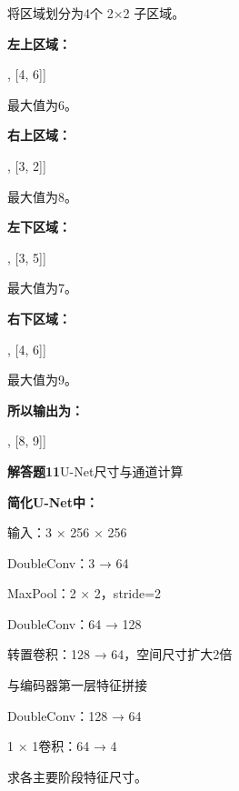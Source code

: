 \documentclass[UTF8,openany,oneside,zihao=-4,fontset=windows]{ctexbook}
\newif\ifshowsolutions
\newcommand{\Question}[2]{%
  \par\Needspace{4\baselineskip}\medskip
  \noindent\textbf{\color{MVBlue}#1}\quad #2\par
}
\newenvironment{AnswerBox}{\begin{tcolorbox}[breakable,colback=MVLight,colframe=MVBlue!45,title={参考答案},fonttitle=\bfseries,boxrule=0.55pt,arc=1.5mm,left=2mm,right=2mm,top=1.5mm,bottom=1.5mm]}{\end{tcolorbox}}
\newcommand{\PracticeSpace}[1]{\ifshowsolutions\else\par\vspace{#1}\par\fi}
\begin{document}
\begin{AnswerBox}
\par 将区域划分为4个 2×2 子区域。
\par\noindent\textbf{左上区域：}
\begin{center}\small\ttfamily [[1, 5], [4, 6]]\end{center}
\par 最大值为6。
\par\noindent\textbf{右上区域：}
\begin{center}\small\ttfamily [[2, 8], [3, 2]]\end{center}
\par 最大值为8。
\par\noindent\textbf{左下区域：}
\begin{center}\small\ttfamily [[7, 2], [3, 5]]\end{center}
\par 最大值为7。
\par\noindent\textbf{右下区域：}
\begin{center}\small\ttfamily [[9, 1], [4, 6]]\end{center}
\par 最大值为9。
\par\noindent\textbf{所以输出为：}
\begin{center}\small\ttfamily [[6, 7], [8, 9]]\end{center}
\end{AnswerBox}
\else
\PracticeSpace{4.2cm}
\fi
\Question{解答题11}{U-Net尺寸与通道计算}
\par\noindent\textbf{简化U-Net中：}
\par 输入：3 × 256 × 256
\par DoubleConv：3 → 64
\par MaxPool：2 × 2，stride=2
\par DoubleConv：64 → 128
\par 转置卷积：128 → 64，空间尺寸扩大2倍
\par 与编码器第一层特征拼接
\par DoubleConv：128 → 64
\par 1 × 1卷积：64 → 4
\par 求各主要阶段特征尺寸。
\ifshowsolutions
\end{document}
